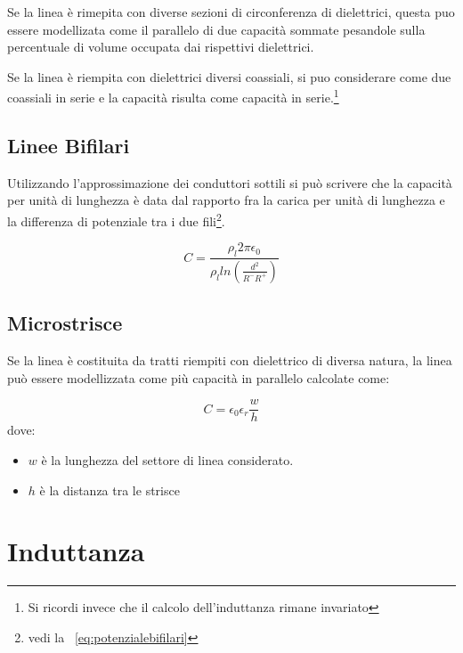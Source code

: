 \documentclass[10pt,a4paper]{report}
\begin{document}
				Se la linea è rimepita con diverse sezioni di circonferenza di dielettrici, questa puo essere modellizata come il parallelo di due capacità sommate pesandole sulla percentuale di volume occupata dai rispettivi dielettrici.
			
				Se la linea è riempita con dielettrici diversi coassiali, si puo considerare come due coassiali in serie e la capacità risulta come capacità in serie.\footnote{Si ricordi invece che il calcolo dell'induttanza rimane invariato}


		\subsection{Linee Bifilari}

			Utilizzando l'approssimazione dei conduttori sottili si può scrivere che la capacità per unità di lunghezza è data dal rapporto fra la carica per unità di lunghezza e la 
			differenza di potenziale tra i due fili\footnote{vedi la ~\ref{eq:potenzialebifilari}}.
			

			\begin{equation}
			C=\frac{\rho_l 2 \pi \epsilon_0}{\rho_l ln(\frac{d^2}{R^-R^+})}
			\label{eq:capacitabifilare}
			\end{equation}



		\subsection{Microstrisce}

	

	 		Se la linea è costituita da tratti riempiti con dielettrico di diversa natura, la linea può essere modellizzata come più capacità in parallelo calcolate come:

	 		\begin{equation}
			C=\epsilon_0 \epsilon_r\frac{w}{h}	 			
	 		\end{equation} 
	 		dove:
	 		\begin{itemize}
	 		\item $w$ è la lunghezza del settore di linea considerato.
	 		\item $h$ è la distanza tra le strisce
	 		\end{itemize}


	\section{Induttanza}
\end{document}

